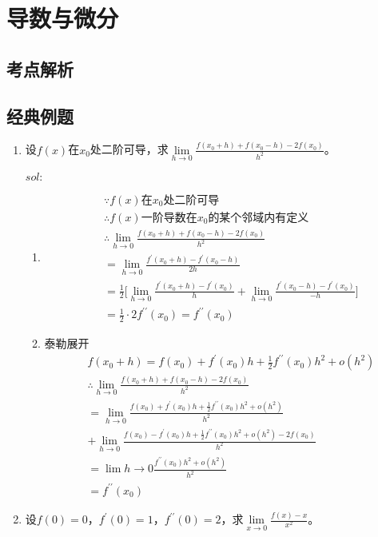 \chapter{导数与微分}
\section{考点解析} %
\label{sec:考点解析}


\section{经典例题} %
\label{sec:经典例题}

\begin{enumerate}[{例}1.]
    \item 设$f(x)$在$x_0$处二阶可导，求$\lim\limits_{h \to 0}\frac{f(x_0+h)+f(x_0-h)-2f(x_0)}{h^2}$。

        $sol:$
        \begin{enumerate}[$1^\circ$]
            \item
                \begin{align*}
                    &\because f(x)\mbox{在}x_0\mbox{处二阶可导}\\
                    &\therefore f(x)\mbox{一阶导数在}x_0\mbox{的某个邻域内有定义}\\
                    &\therefore \lim_{h \to 0}\frac{f(x_0+h)+f(x_0-h)-2f(x_0)}{h^2}\\
                    &=\lim_{h \to 0}\frac{f^{\prime}(x_0+h)-f^{\prime}(x_0-h)}{2h}\\
                    &=\frac{1}{2}\bigg[\lim_{h \to 0}\frac{f^{\prime}(x_0+h)-f^{\prime}(x_0)}{h}+\lim_{h \to 0}\frac{f^{\prime}(x_0-h)-f^{\prime}(x_0)}{-h}\bigg]\\
                    &=\frac{1}{2}\cdot 2 f^{\prime\prime}(x_0)=f^{\prime\prime}(x_0)
                \end{align*}
            \item 泰勒展开
                \begin{align*}
                    &f(x_0+h)=f(x_0)+f^{\prime}(x_0)h+\frac{1}{2}f^{\prime\prime}(x_0)h^2+o(h^2)\\
                    &\therefore\lim_{h \to 0}\frac{f(x_0+h)+f(x_0-h)-2f(x_0)}{h^2}\\
                    &=\lim_{h \to 0}\frac{f(x_0)+f^{\prime}(x_0)h+\frac{1}{2}f^{\prime\prime}(x_0)h^2+o(h^2)}{h^2}\\
                    &+\lim_{h \to 0}\frac{f(x_0)-f^{\prime}(x_0)h+\frac{1}{2}f^{\prime\prime}(x_0)h^2+o(h^2)-2f(x_0)}{h^2}\\
                    &=\lim{h \to 0}\frac{f^{\prime\prime}(x_0)h^2+o(h^2)}{h^2}\\
                    &=f^{\prime\prime}(x_0)
                \end{align*}
        \end{enumerate}
    \item 设$f(0)=0$，$f^{\prime}(0)=1$，$f^{\prime\prime}(0)=2$，求$\lim\limits_{x \to 0}\frac{f(x)-x}{x^2}$。


\end{enumerate}
